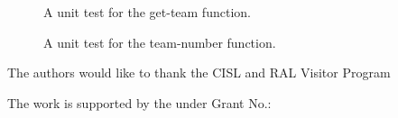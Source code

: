 \begin{figure}
  
  \caption{A unit test for the get-team function.\label{figure:get-team-test}}
\end{figure}

%

\begin{figure}
  
  \caption{A unit test for the team-number function.\label{figure:team-number-test}}
\end{figure}


\begin{acks}
  The authors would like to thank the CISL and RAL Visitor Program

  The work is
  supported by the  under Grant
  No.:~

\end{acks}
